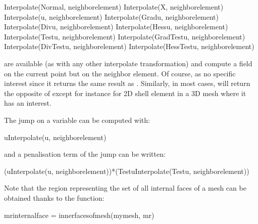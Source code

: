 \documentclass[a4paper,11pt,english]{sphinxmanual}
\begin{document}
\begin{sphinxVerbatim}[commandchars=\\\{\}]
Interpolate(Normal, neighbor\PYGZus{}element)
Interpolate(X, neighbor\PYGZus{}element)
Interpolate(u, neighbor\PYGZus{}element)
Interpolate(Grad\PYGZus{}u, neighbor\PYGZus{}element)
Interpolate(Div\PYGZus{}u, neighbor\PYGZus{}element)
Interpolate(Hess\PYGZus{}u, neighbor\PYGZus{}element)
Interpolate(Test\PYGZus{}u, neighbor\PYGZus{}element)
Interpolate(Grad\PYGZus{}Test\PYGZus{}u, neighbor\PYGZus{}element)
Interpolate(Div\PYGZus{}Test\PYGZus{}u, neighbor\PYGZus{}element)
Interpolate(Hess\PYGZus{}Test\PYGZus{}u, neighbor\PYGZus{}element)
\end{sphinxVerbatim}

are available (as with any other interpolate transformation) and compute a field on the current point but on the neighbor element. Of course,  as no specific interest since it returns the same result as . Similarly, in most cases,  will return the opposite of  except for instance for 2D shell element in a 3D mesh where it has an interest.

The jump on a variable  can be computed with:

\begin{sphinxVerbatim}[commandchars=\\\{\}]
u\PYGZhy{}Interpolate(u, neighbor\PYGZus{}element)
\end{sphinxVerbatim}

and a penalisation term of the jump can be written:

\begin{sphinxVerbatim}[commandchars=\\\{\}]
(u\PYGZhy{}Interpolate(u, neighbor\PYGZus{}element))*(Test\PYGZus{}u\PYGZhy{}Interpolate(Test\PYGZus{}u, neighbor\PYGZus{}element))
\end{sphinxVerbatim}

Note that the region representing the set of all internal faces of a mesh can be obtained thanks to the function:

\begin{sphinxVerbatim}[commandchars=\\\{\}]
mr\PYGZus{}internal\PYGZus{}face = inner\PYGZus{}faces\PYGZus{}of\PYGZus{}mesh(my\PYGZus{}mesh, mr)
\end{sphinxVerbatim}
\end{document}
